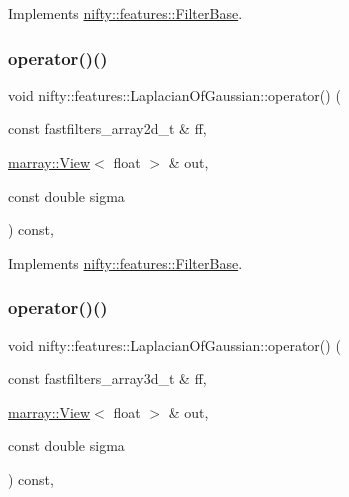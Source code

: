 Implements \hyperlink{structnifty_1_1features_1_1FilterBase_a1c278e2b6ef0cb2a5bba2f758c6855e2}{nifty\+::features\+::\+Filter\+Base}.

\mbox{\label{structnifty_1_1features_1_1LaplacianOfGaussian_a35537b627fd708494af6857ad5312e4b}} 
\subsubsection{\texorpdfstring{operator()()}{operator()()}\hspace{0.1cm}{\footnotesize\ttfamily [1/2]}}
{\footnotesize\ttfamily void nifty\+::features\+::\+Laplacian\+Of\+Gaussian\+::operator() (\begin{DoxyParamCaption}\item[{const fastfilters\+\_\+array2d\+\_\+t \&}]{ff,  }\item[{\hyperlink{classandres_1_1View}{marray\+::\+View}$<$ float $>$ \&}]{out,  }\item[{const double}]{sigma }\end{DoxyParamCaption}) const\hspace{0.3cm}{\ttfamily [inline]}, {\ttfamily [virtual]}}



Implements \hyperlink{structnifty_1_1features_1_1FilterBase_a17c77d36dd765c5ec0b163102428656c}{nifty\+::features\+::\+Filter\+Base}.

\mbox{\label{structnifty_1_1features_1_1LaplacianOfGaussian_a1b7536cdff2a3f16035d55c58e3922ce}} 
\subsubsection{\texorpdfstring{operator()()}{operator()()}\hspace{0.1cm}{\footnotesize\ttfamily [2/2]}}
{\footnotesize\ttfamily void nifty\+::features\+::\+Laplacian\+Of\+Gaussian\+::operator() (\begin{DoxyParamCaption}\item[{const fastfilters\+\_\+array3d\+\_\+t \&}]{ff,  }\item[{\hyperlink{classandres_1_1View}{marray\+::\+View}$<$ float $>$ \&}]{out,  }\item[{const double}]{sigma }\end{DoxyParamCaption}) const\hspace{0.3cm}{\ttfamily [inline]}, {\ttfamily [virtual]}}



